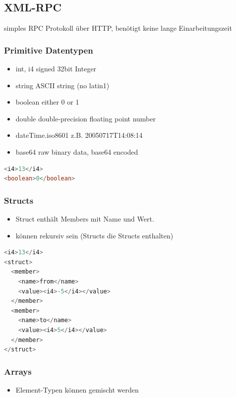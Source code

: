 \documentclass[10pt]{article}
\begin{document}
\subsection{XML-RPC}

simples RPC Protokoll über HTTP, benötigt keine lange Einarbeitungszeit
\subsubsection{Primitive Datentypen}
\begin{itemize}
\item int, i4 \tab signed 32bit Integer
\item string \tab ASCII string (no latin1)
\item boolean \tab either 0 or 1
\item double \tab double-precision floating point number
\item dateTime.iso8601 \tab z.B. 20050717T14:08:14
\item base64 \tab raw binary data, base64 encoded
\end{itemize}

\begin{lstlisting}[language=Java, caption=Beispiele, style=JavaStyle]
<i4>13</i4>
<boolean>0</boolean>
\end{lstlisting}

\subsubsection{Structs}
\begin{itemize}
\item Struct enthält Members mit Name und Wert.
\item können rekursiv sein (Structs die Structs enthalten)
\end{itemize}

\begin{lstlisting}[language=Java, caption=Struct Beispiel, style=JavaStyle]
<i4>13</i4>
<struct> 
  <member> 
    <name>from</name> 
    <value><i4>-5</i4></value> 
  </member> 
  <member> 
    <name>to</name> 
    <value><i4>5</i4></value> 
  </member>
</struct>
\end{lstlisting}

\subsubsection{Arrays}
\begin{itemize}
\item Element-Typen können gemischt werden
\end{itemize}
\end{document}
